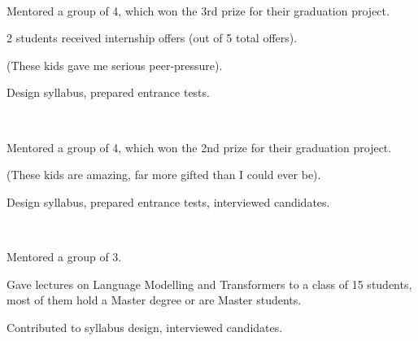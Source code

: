 \\
\begin{zitemize}
    \item Mentored a group of 4, which won the 3rd prize for their graduation project.
    \item 2 students received internship offers (out of 5 total offers).
    \item (These kids gave me serious peer-pressure).
    \item Design syllabus, prepared entrance tests.
\end{zitemize}

\\
\begin{zitemize}
    \item Mentored a group of 4, which won the 2nd prize for their graduation project.
    \item (These kids are amazing, far more gifted than I could ever be).
    \item Design syllabus, prepared entrance tests, interviewed candidates.
\end{zitemize}

\\
\begin{zitemize}
    \item Mentored a group of 3.
    \item Gave lectures on Language Modelling and Transformers to a class of 15 students, most of them hold a Master degree or are Master students.
    \item Contributed to syllabus design, interviewed candidates.
\end{zitemize}